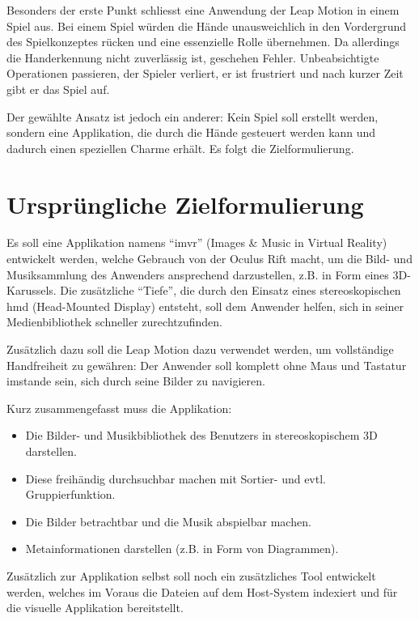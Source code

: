 Besonders der erste Punkt schliesst eine Anwendung der Leap Motion in einem Spiel aus. Bei einem Spiel würden die Hände unausweichlich in den Vordergrund des Spielkonzeptes rücken und eine essenzielle Rolle übernehmen. Da allerdings die Handerkennung nicht zuverlässig ist, geschehen Fehler. Unbeabsichtigte Operationen passieren, der Spieler verliert, er ist frustriert und nach kurzer Zeit gibt er das Spiel auf.

Der gewählte Ansatz ist jedoch ein anderer: Kein Spiel soll erstellt werden, sondern eine Applikation, die durch die Hände gesteuert werden kann und dadurch einen speziellen Charme erhält. Es folgt die Zielformulierung.

\section{Ursprüngliche Zielformulierung}

Es soll eine Applikation namens ``\gls{imvr}'' (Images & Music in Virtual Reality) entwickelt werden, welche Gebrauch von der Oculus Rift macht, um die Bild- und Musiksammlung des Anwenders ansprechend darzustellen, z.B. in Form eines 3D-Karussels. Die zusätzliche ``Tiefe'', die durch den Einsatz eines stereoskopischen \gls{hmd} (Head-Mounted Display) entsteht, soll dem Anwender helfen, sich in seiner Medienbibliothek schneller zurechtzufinden.

Zusätzlich dazu soll die Leap Motion dazu verwendet werden, um vollständige Handfreiheit zu gewähren: Der Anwender soll komplett ohne Maus und Tastatur imstande sein, sich durch seine Bilder zu navigieren.

Kurz zusammengefasst muss die Applikation:

\begin{itemize}
	\item Die Bilder- und Musikbibliothek des Benutzers in stereoskopischem 3D darstellen.
	\item Diese freihändig durchsuchbar machen mit Sortier- und evtl. Gruppierfunktion.
	\item Die Bilder betrachtbar und die Musik abspielbar machen.
	\item Metainformationen darstellen (z.B. in Form von Diagrammen).
\end{itemize}

Zusätzlich zur Applikation selbst soll noch ein zusätzliches Tool entwickelt werden, welches im Voraus die Dateien auf dem Host-System indexiert und für die visuelle Applikation bereitstellt.

